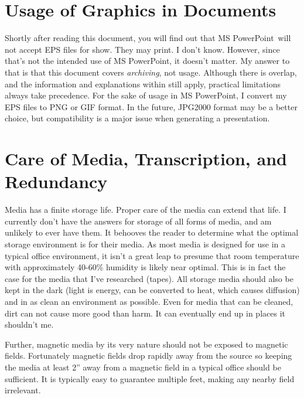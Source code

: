 \documentclass[a4paper]{article}
\begin{document}
\section{Usage of Graphics in Documents%
  \label{usage-of-graphics-in-documents}%
}

Shortly after reading this document, you will find out that MS
PowerPoint~will not accept EPS files for show. They may print. I don't
know. However, since that’s not the intended use of MS PowerPoint, it
doesn't matter. My answer to that is that this document covers
\emph{archiving}, not usage. Although there is overlap, and the information
and explanations within still apply, practical limitations always take
precedence. For the sake of usage in MS PowerPoint, I convert my EPS
files to PNG or GIF format. In the future, JPG2000 format may be a
better choice, but compatibility is a major issue when generating a
presentation.


\section{Care of Media, Transcription, and Redundancy%
  \label{care-of-media-transcription-and-redundancy}%
}

Media has a finite storage life. Proper care of the media can extend
that life. I currently don't have the answers for storage of all forms
of media, and am unlikely to ever have them. It behooves the reader to
determine what the optimal storage environment is for their media. As
most media is designed for use in a typical office environment, it isn’t
a great leap to presume that room temperature with approximately 40-60\%
humidity is likely near optimal. This is in fact the case for the media
that I’ve researched (tapes). All storage media should also be kept in
the dark (light is energy, can be converted to heat, which causes
diffusion) and in as clean an environment as possible. Even for media
that can be cleaned, dirt can not cause more good than harm. It can
eventually end up in places it shouldn’t me.

Further, magnetic media by its very nature should not be exposed to
magnetic fields. Fortunately magnetic fields drop rapidly away from the
source so keeping the media at least 2” away from a magnetic field in a
typical office should be sufficient. It is typically easy to guarantee
multiple feet, making any nearby field irrelevant.
\end{document}
